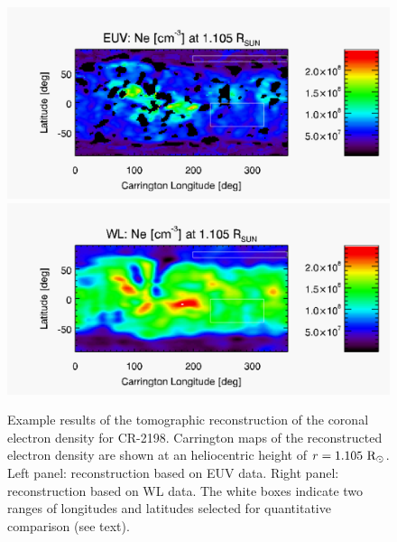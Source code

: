 \documentclass[baaa]{baaa}
\begin{document}
\begin{figure}[t]
  \centering
  \includegraphics[width=\columnwidth]{map_ne_aia.pdf}
  \includegraphics[width=\columnwidth]{map_ne_kcor.pdf}
  \caption{{Example results of the tomographic reconstruction of the coronal electron density} for CR-2198. Carrington maps of the reconstructed electron density are shown at an heliocentric height of $r=1.105~\rm{R}_\odot$. Left panel: reconstruction based on EUV data. Right panel: reconstruction based on WL data. The white boxes indicate two ranges of longitudes and latitudes selected for quantitative comparison (see text).}
  \label{fig_maps}
\end{figure}
\end{document}
